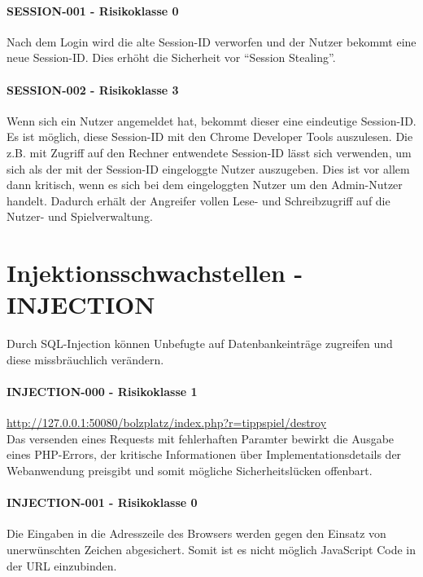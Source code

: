 \paragraph{SESSION-001 - Risikoklasse 0}
Nach dem Login wird die alte Session-ID verworfen und der Nutzer bekommt eine neue Session-ID. Dies erhöht die Sicherheit vor “Session Stealing”.

\paragraph{SESSION-002 - Risikoklasse 3}
Wenn sich ein Nutzer angemeldet hat, bekommt dieser eine eindeutige Session-ID. Es ist möglich, diese Session-ID mit den Chrome Developer Tools auszulesen. Die z.B. mit Zugriff auf den Rechner entwendete Session-ID lässt sich verwenden, um sich als der mit der Session-ID eingeloggte Nutzer auszugeben. Dies ist vor allem dann kritisch, wenn es sich bei dem eingeloggten Nutzer um den Admin-Nutzer handelt. Dadurch erhält der Angreifer vollen Lese- und Schreibzugriff auf die Nutzer- und Spielverwaltung.


\section{Injektionsschwachstellen - INJECTION}
Durch SQL-Injection können Unbefugte auf Datenbankeinträge zugreifen und diese missbräuchlich verändern. 

\clearpage
\paragraph{INJECTION-000 - Risikoklasse 1}
\url{http://127.0.0.1:50080/bolzplatz/index.php?r=tippspiel/destroy} \\
Das versenden eines Requests mit fehlerhaften Paramter bewirkt die Ausgabe eines PHP-Errors, der kritische Informationen über Implementationsdetails der Webanwendung preisgibt und somit mögliche Sicherheitslücken offenbart.

\paragraph{INJECTION-001 - Risikoklasse 0}
Die Eingaben in die Adresszeile des Browsers werden gegen den Einsatz von unerwünschten Zeichen abgesichert. Somit ist es nicht möglich JavaScript Code in der URL einzubinden.

